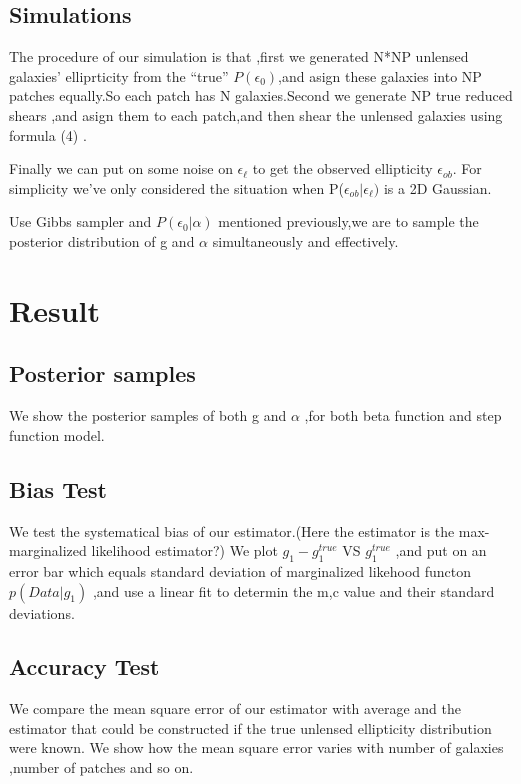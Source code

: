 \documentclass[useAMS,usenatbib]{mn2e}
\begin{document}
\subsection{Simulations}

The procedure of our simulation is that ,first we generated N{*}NP
unlensed galaxies' elliprticity from the ``true'' $P(\epsilon_{0})$,and
asign these galaxies into NP patches equally.So each patch has N galaxies.Second
we generate NP true reduced shears ,and asign them to each patch,and
then shear the unlensed galaxies using formula (4) .

Finally we can put on some noise on $\epsilon_{\ell}$ to get the
observed ellipticity $\epsilon_{ob}$. For simplicity we've only considered
the situation when P($\epsilon_{ob}|\epsilon_{\ell})$ is a 2D Gaussian.

Use Gibbs sampler and $P(\epsilon_{0}|\alpha)$ mentioned previously,we
are to sample the posterior distribution of g and $\alpha$ simultaneously
and effectively.




\section{Result}
\label{sec:XXX}

\subsection{Posterior samples}
We show the posterior samples of both g and $\alpha$ ,for both beta function and step function model.
\subsection{Bias Test}
We test the systematical bias of our estimator.(Here the estimator is the max-marginalized likelihood estimator?)
We plot $g_{1}-g_{1}^{true}$ VS $g_{1}^{true}$ ,and put on an error bar which equals standard deviation of 
marginalized likehood functon $p(Data|g_{1})$ ,and use a linear fit to determin the m,c value and their standard 
deviations.

\subsection{Accuracy Test}
We compare the mean square error of our estimator with average and the estimator that could be constructed if the true unlensed
ellipticity distribution were known.
We show how the mean square error varies with number of galaxies ,number of patches and so on.
\end{document}
